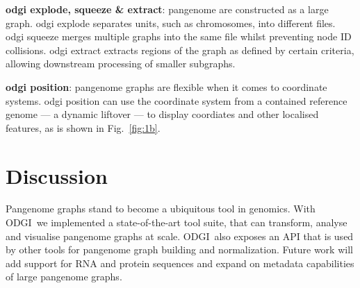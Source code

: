 \documentclass{bioinfo}
\newcommand{\odgi}{ODGI}
\newcommand{\cmd}[1]{{\scriptsize\textrm{#1}}}
\newcommand{\cmdbf}[1]{{\textbf{#1}}}
\newcommand{\topic}[1]{{\cmdbf{#1}}:}
\begin{document}
    \topic{odgi explode, squeeze \& extract} pangenome are constructed
    as a large graph. \cmd{odgi explode} separates units, such as
    chromosomes, into different files.  \cmd{odgi squeeze} merges
    multiple graphs into the same file whilst preventing node ID
    collisions. \cmd{odgi extract} extracts regions of the graph as
    defined by certain criteria, allowing downstream processing of
    smaller subgraphs.

    \topic{odgi position} pangenome graphs are flexible when it comes
    to coordinate systems. \cmd{odgi position} can use the coordinate
    system from a contained reference genome --- a dynamic liftover
    --- to display coordiates and other localised features, as is shown in
    Fig.~\ref{fig:1b}.


    \section{Discussion}

    Pangenome graphs stand to become a ubiquitous tool in
    genomics\citep{Eizenga:2020}.  With \odgi\ we implemented a
    state-of-the-art tool suite, that can transform, analyse and
    visualise pangenome graphs at scale.  \odgi\ also exposes an API
    that is used by other tools for pangenome graph building and
    normalization. Future work will add support for RNA and protein
    sequences and expand on metadata capabilities of large pangenome
    graphs.
\end{document}
